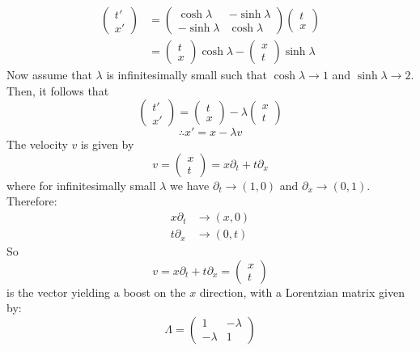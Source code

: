 \documentclass{article}
\begin{document}
 		\begin{align*}
 			\begin{pmatrix}
 				t' \\
 				x' 
 			\end{pmatrix} & =
 			\begin{pmatrix}
 				\cosh \lambda & - \sinh \lambda \\
 				- \sinh\lambda & \cosh \lambda
 			\end{pmatrix}
 			\begin{pmatrix}
 				t \\
 				x 
 			\end{pmatrix} \\
 			&= \begin{pmatrix}
 				t \\
 				x 
 			\end{pmatrix}\cosh \lambda - \begin{pmatrix}
 				x \\
 				t 
 			\end{pmatrix}\sinh \lambda 
 		\end{align*}
 		Now assume that $\lambda$ is infinitesimally small such that $\cosh \lambda \to 1$ and $\sinh \lambda \to 2$. Then, it follows that
 		$$ 
 			\begin{pmatrix}
 				t' \\
 				x' 
 			\end{pmatrix} = 
 			\begin{pmatrix}
 				t \\
 				x 
 			\end{pmatrix} - \lambda \begin{pmatrix}
 			x \\
 			t 
 			\end{pmatrix}
 		$$
 		$$ \therefore x' = x-\lambda v$$
 		The velocity $v$ is given by
 		$$ v = \begin{pmatrix}
 			x \\ t
 		\end{pmatrix} = x \partial_t + t \partial_x$$ where for infinitesimally small $\lambda$ we have $\partial_t \to (1,0)$ and $\partial_x \to (0,1)$. Therefore:
 		\begin{align*}
 			x \partial_t &\to (x,0) \\
 			t \partial_x &\to (0,t)
 		\end{align*}
 		So $$\boxed{v = x \partial_t + t \partial_x = \begin{pmatrix} x \\ t \end{pmatrix}}$$
 		is the vector yielding a boost on the $x$ direction, with a Lorentzian matrix given by:
 		$$ \Lambda = \begin{pmatrix}
 			1 & -\lambda \\
 			-\lambda & 1
 		\end{pmatrix}$$
 		
\end{document}
